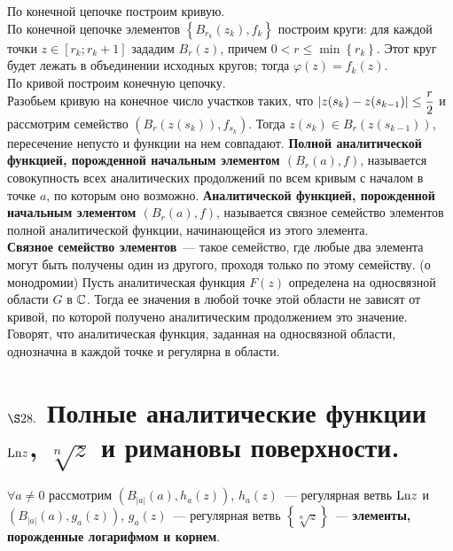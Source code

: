 \pr
По конечной цепочке построим кривую.
\\
По конечной цепочке элементов $\left\{ B_{r_k}(z_k), f_k \right\}$ построим
круги: для каждой точки $z \in [r_k; r_k+1]$ зададим $B_r(z)$, причем $0 <r \leq
\min \left\{ r_k \right\}$. Этот круг будет лежать в объединении исходных
кругов; тогда $\varphi(z) = f_k(z)$.
\\
По кривой построим конечную цепочку.
\\
Разобьем кривую на конечное число участков таких, что $\left| z(s_k) -
    z(s_{k-1}) \right|\leq \displaystyle\frac{r}{2}$ и рассмотрим семейство $\left(
    B_r(z(s_k)), f_{s_k} \right)$. Тогда $z(s_{k})\in B_r(z(s_{k-1}))$,
пересечение непусто и функции на нем совпадают.
\Def
\textbf{Полной аналитической функцией, порожденной начальным элементом $\left(
      B_r(a), f \right)$}, называется совокупность всех аналитических
продолжений по всем кривым с началом в точке $a$, по которым оно возможно.
\Def
\textbf{Аналитической функцией, порожденной начальным элементом $\left(
      B_r(a), f \right)$}, называется связное семейство элементов полной
аналитической функции, начинающейся из этого элемента.
\\
\textbf{Связное семейство элементов}~--- такое семейство, где любые два элемента
могут быть получены один из другого, проходя только по этому семейству.
\theorem (о монодромии)
Пусть аналитическая функция $F(z)$ определена на односвязной области $G$ в
$\mathbb{C}$. Тогда ее значения в любой точке этой области не зависят от кривой, по
которой получено аналитическим продолжением это значение.
\\
Говорят, что аналитическая функция, заданная на односвязной области, однозначна
в каждой точке и регулярна в области.
\section{$\S 28.$ Полные аналитические функции $\mathrm{Ln} z$, $\sqrt[n]{z}$ и римановы
  поверхности.}
$\forall a \neq 0$ рассмотрим $\left( B_{\left| a \right|}(a), h_a(z) \right)$,
$h_a(z)$~--- регулярная ветвь $\mathrm{Ln} z$ и $\left( B_{\left| a \right|}(a), g_a(z)
\right)$, $g_a(z)$~--- регулярная ветвь $\left\{ \sqrt[n]{z} \right\}$~---
\textbf{элементы, порожденные логарифмом и корнем}.